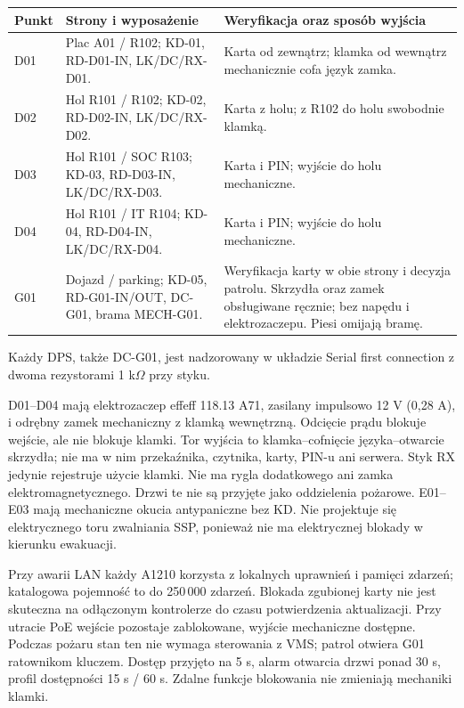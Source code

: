 \begin{tabularx}{\linewidth}{@{}P{16mm}P{41mm}Y@{}}
\toprule Punkt & Strony i wyposażenie & Weryfikacja oraz sposób wyjścia\\\midrule
D01 & Plac A01 / R102; KD-01, RD-D01-IN, LK/DC/RX-D01. & Karta od zewnątrz; klamka od wewnątrz mechanicznie cofa język zamka.\\
D02 & Hol R101 / R102; KD-02, RD-D02-IN, LK/DC/RX-D02. & Karta z holu; z R102 do holu swobodnie klamką.\\
D03 & Hol R101 / SOC R103; KD-03, RD-D03-IN, LK/DC/RX-D03. & Karta i PIN; wyjście do holu mechaniczne.\\
D04 & Hol R101 / IT R104; KD-04, RD-D04-IN, LK/DC/RX-D04. & Karta i PIN; wyjście do holu mechaniczne.\\
G01 & Dojazd / parking; KD-05, RD-G01-IN/OUT, DC-G01, brama MECH-G01. & Weryfikacja karty w obie strony i decyzja patrolu. Skrzydła oraz zamek obsługiwane ręcznie; bez napędu i elektrozaczepu. Piesi omijają bramę.\\\bottomrule
\end{tabularx}

Każdy DPS, także DC-G01, jest nadzorowany w układzie Serial first connection z dwoma rezystorami 1 k$\Omega$ przy styku.\cite{S-KD-WIRING}

D01--D04 mają elektrozaczep effeff 118.13 A71, zasilany impulsowo 12 V (0,28 A), i odrębny zamek mechaniczny z klamką wewnętrzną. Odcięcie prądu blokuje wejście, ale nie blokuje klamki. Tor wyjścia to klamka--cofnięcie języka--otwarcie skrzydła; nie ma w nim przekaźnika, czytnika, karty, PIN-u ani serwera. Styk RX jedynie rejestruje użycie klamki. Nie ma rygla dodatkowego ani zamka elektromagnetycznego. Drzwi te nie są przyjęte jako oddzielenia pożarowe. E01--E03 mają mechaniczne okucia antypaniczne bez KD. Nie projektuje się elektrycznego toru zwalniania SSP, ponieważ nie ma elektrycznej blokady w kierunku ewakuacji.\cite{S-LOCK}

Przy awarii LAN każdy A1210 korzysta z lokalnych uprawnień i pamięci zdarzeń; katalogowa pojemność to do 250\,000 zdarzeń. Blokada zgubionej karty nie jest skuteczna na odłączonym kontrolerze do czasu potwierdzenia aktualizacji. Przy utracie PoE wejście pozostaje zablokowane, wyjście mechaniczne dostępne. Podczas pożaru stan ten nie wymaga sterowania z VMS; patrol otwiera G01 ratownikom kluczem. Dostęp przyjęto na 5 s, alarm otwarcia drzwi ponad 30 s, profil dostępności 15 s / 60 s. Zdalne funkcje blokowania nie zmieniają mechaniki klamki.\cite{S-KD,S-VMS}


